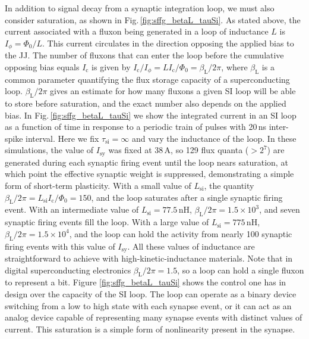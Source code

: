 \documentclass[twocolumn]{article}
\begin{document}
In addition to signal decay from a synaptic integration loop, we must also consider saturation, as shown in Fig.\,\ref{fig:sffg_betaL_tauSi}. As stated above, the current associated with a fluxon being generated in a loop of inductance $L$ is $I_{\phi} = \Phi_0/L$. This current circulates in the direction opposing the applied bias to the JJ. The number of fluxons that can enter the loop before the cumulative opposing bias equals $I_{\mathrm{c}}$ is given by $I_{\mathrm{c}}/I_{\phi} = L I_{\mathrm{c}}/\Phi_0 = \beta_{\mathrm{L}}/2 \pi$, where $\beta_{\mathrm{L}}$ is a common parameter quantifying the flux storage capacity of a superconducting loop. $\beta_{\mathrm{L}}/2\pi$ gives an estimate for how many fluxons a given SI loop will be able to store before saturation, and the exact number also depends on the applied bias. In Fig.\,\ref{fig:sffg_betaL_tauSi} we show the integrated current in an SI loop as a function of time in response to a periodic train of pulses with 20\,ns inter-spike interval. Here we fix $\tau_{\mathrm{si}} = \infty$ and vary the inductance of the loop. In these simulations, the value of $I_{\mathrm{sy}}$ was fixed at 38\,\textmu A, so 129 flux quanta ($> 2^7$) are generated during each synaptic firing event until the loop nears saturation, at which point the effective synaptic weight is suppressed, demonstrating a simple form of short-term plasticity. With a small value of $L_{\mathrm{si}}$, the quantity $\beta_{\mathrm{L}}/2\pi = L_{\mathrm{si}} I_{\mathrm{c}}/\Phi_0 =  150$, and the loop saturates after a single synaptic firing event. With an intermediate value of $L_{\mathrm{si}} = 77.5$\,nH, $\beta_{\mathrm{L}}/2\pi = 1.5\times 10^3$, and seven synaptic firing events fill the loop. With a large value of $L_{\mathrm{si}} = 775$\,nH, $\beta_{\mathrm{L}}/2\pi = 1.5\times 10^{4}$, and the loop can hold the activity from nearly 100 synaptic firing events with this value of $I_{\mathrm{sy}}$. All these values of inductance are straightforward to achieve with high-kinetic-inductance materials. Note that in digital superconducting electronics $\beta_{\mathrm{L}}/2\pi = 1.5$, so a loop can hold a single fluxon to represent a bit. Figure \ref{fig:sffg_betaL_tauSi} shows the control one has in design over the capacity of the SI loop. The loop can operate as a binary device switching from a low to high state with each synapse event, or it can act as an analog device capable of representing many synapse events with distinct values of current. This saturation is a simple form of nonlinearity present in the synapse. 
\end{document}
